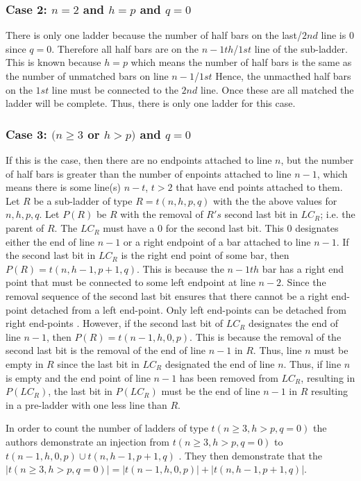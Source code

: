 \subsubsection{Case 2: $n=2$ and $h=p$ and $q=0$}
There is only one ladder because the number of half bars 
on the last/$2nd$ line is 0 since $q=0$. Therefore all half bars are on the 
$n-1th$/$1st$ line of the sub-ladder. This is known because 
$h=p$ which means the number of half bars is the same as 
the number of unmatched bars on line $n-1$/$1st$ Hence, the unmacthed 
half bars on the $1st$ line must be connected to the $2nd$ 
line. Once these are all matched the ladder will be complete. 
Thus, there is only one ladder for this case.

\subsubsection{Case 3: $(n \geq 3$ or $h>p)$ and $q=0$}
If this is the case, then there are no endpoints attached to 
line $n$, but the number of half bars is greater than the 
number of enpoints attached to line $n-1$, which means there is 
some line(s) $n-t$, $t>2$ that have end points attached to them.
Let $R$ be a sub-ladder of type $R=t(n,h,p,q)$
with the the above values for $n,h,p,q$. Let $P(R)$ be 
$R$ with the removal of $R's$ second last bit in $LC_{R}$; i.e. the parent of 
$R$.  The $LC_{R}$ must have a $0$ for the second last bit. This $0$ designates either the 
end of line $n-1$ or a right endpoint of a bar attached to line $n-1$. 
If the second last bit in $LC_{R}$ is the right end point of some 
bar, then $P(R)=t(n,h-1,p+1,q)$. This is because the $n-1th$ bar 
has a right end point that must be connected to some left  
endpoint at line $n-2$. Since the removal sequence of the second 
last bit ensures that there cannot be a right end-point detached 
from a left end-point. Only left end-points can be detached 
from right end-points \cite{A6}. However, if the second last bit 
of $LC_{R}$ designates the end of line $n-1$, then $P(R)=t(n-1,h,0,p)$. 
This is because the removal of the second last bit 
is the removal of the end of line $n-1$ in $R$. Thus, 
line $n$ must be empty in $R$ since the last bit in $LC_{R}$
designated the end of line $n$. Thus, if line $n$ is empty 
and the end point of line $n-1$ has been removed from $LC_{R}$, 
resulting in $P(LC_{R})$, the last bit in $P(LC_{R})$ must be 
the end of line $n-1$ in $R$ resulting in a pre-ladder with one 
less line than $R$.\par  
In order to count the number of ladders of type 
$t(n\geq3, h>p, q=0)$ the authors demonstrate an injection 
from $t(n\geq3, h>p, q=0)$ to $t(n-1,h,0,p) \cup t(n,h-1,p+1,q)$ \cite{A6}.
They then demonstrate that the $|t(n\geq3, h>p, q=0)|=|t(n-1,h,0,p)| + |t(n,h-1,p+1,q)|$.
